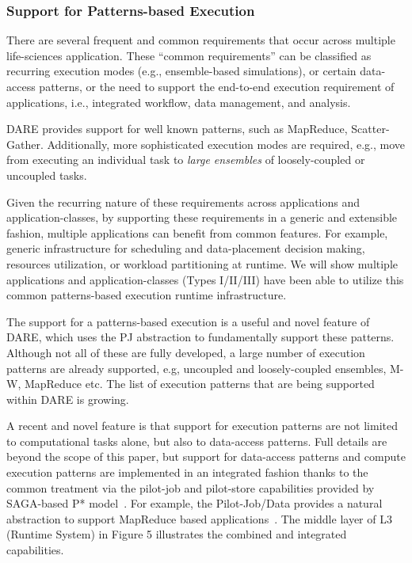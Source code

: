 \documentclass[]{svjour3}
\begin{document}
\subsubsection{Support for Patterns-based Execution}


There are several frequent and common requirements that occur across
multiple life-sciences application.  These ``common requirements'' can
be classified as recurring execution modes (e.g., ensemble-based
simulations), or certain data-access patterns, or the need to support
the end-to-end execution requirement of applications, i.e., integrated
workflow, data management, and analysis.

DARE provides support for well known patterns, such as MapReduce,
Scatter-Gather.  Additionally, more sophisticated execution modes are
required, e.g., move from executing an individual task to
\textit{large ensembles} of loosely-coupled or uncoupled tasks.

Given the recurring nature of these requirements across applications
and application-classes, by supporting these requirements in a generic
and extensible fashion, multiple applications can benefit from common
features.  For example, generic infrastructure for scheduling and
data-placement decision making, resources utilization, or workload
partitioning at runtime. We will show multiple applications and
application-classes (Types I/II/III) have been able to utilize
this common patterns-based execution runtime infrastructure.

The support for a patterns-based execution is a useful and novel
feature of DARE, which uses the PJ abstraction to fundamentally
support these patterns. Although not all of these are fully developed,
a large number of execution patterns are already supported, e.g,
uncoupled and loosely-coupled ensembles, M-W, MapReduce etc. The list
of execution patterns that are being supported within DARE is growing.

A recent and novel feature is that support for execution patterns are
not limited to computational tasks alone, but also to data-access
patterns.  Full details are beyond the scope of this paper, but
support for data-access patterns and compute execution patterns are
implemented in an integrated fashion thanks to the common treatment
via the pilot-job and pilot-store capabilities provided by SAGA-based
P* model~\cite{pstar11}.  For example, the Pilot-Job/Data provides a
natural abstraction to support MapReduce based
applications~\cite{mapreduce12}.  The middle layer of L3 (Runtime
System) in Figure 5 illustrates the combined and integrated
capabilities.
\end{document}
